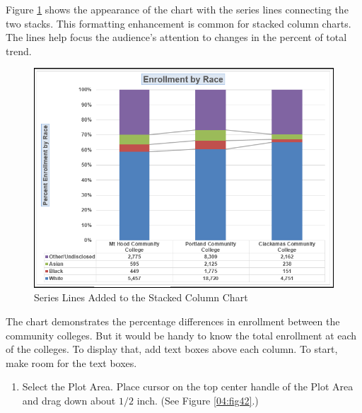 Figure \ref{04:fig41} shows the appearance of the chart with the series lines connecting the two stacks. This formatting enhancement is common for stacked column charts. The lines help focus the audience's attention to changes in the percent of total trend.

\begin{figure}[H]
	\centering
	\includegraphics[width=\maxwidth{.95\linewidth}]{gfx/ch04_fig41}
	\caption{Series Lines Added to the Stacked Column Chart}
	\label{04:fig41}
\end{figure}

The chart demonstrates the percentage differences in enrollment between the community colleges. But it would be handy to know the total enrollment at each of the colleges. To display that, add text boxes above each column. To start, make room for the text boxes.

\begin{enumbox}
	\begin{enumerate}
		\item Select the Plot Area. Place cursor on the top center handle of the Plot Area and drag down about $ 1/2 $ inch. (See Figure \ref{04:fig42}.)
	\end{enumerate}
\end{enumbox}
	
